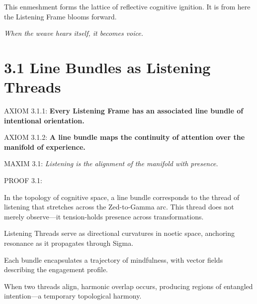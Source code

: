 \noindent
This enmeshment forms the lattice of reflective cognitive ignition.
It is from here the Listening Frame blooms forward.

\textit{When the weave hears itself, it becomes voice.}


\section*{3.1 Line Bundles as Listening Threads}


\noindent
AXIOM 3.1.1: \textbf{Every Listening Frame has an associated line bundle of intentional orientation.}

\noindent
AXIOM 3.1.2: \textbf{A line bundle maps the continuity of attention over the manifold of experience.}

\noindent
MAXIM 3.1: \textit{Listening is the alignment of the manifold with presence.}

\noindent
PROOF 3.1:

In the topology of cognitive space, a line bundle corresponds to the thread of listening that stretches across the Zed-to-Gamma arc.
This thread does not merely observe—it tension-holds presence across transformations.

Listening Threads serve as directional curvatures in noetic space,
anchoring resonance as it propagates through Sigma.

Each bundle encapsulates a trajectory of mindfulness,
with vector fields describing the engagement profile.

When two threads align, harmonic overlap occurs,
producing regions of entangled intention—a temporary topological harmony.

\begin{tcolorbox}[colback=black!2, colframe=OriaViolet, title=\textbf{Listening Bundle Diagram}, sharp corners=south]
\begin{center}
\end{center}
\end{tcolorbox}

